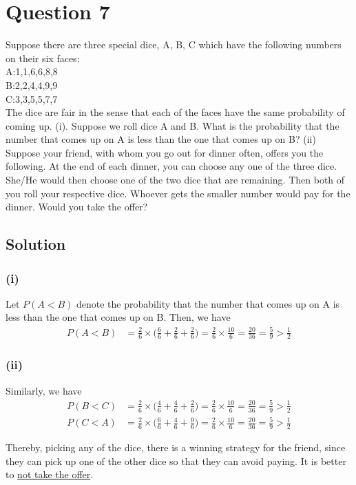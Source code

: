 \section*{Question 7}

Suppose there are three special dice, A, B, C which have the following numbers on their six faces: \\
A:\@ 1,1,6,6,8,8\\
B:\@ 2,2,4,4,9,9\\
C:\@ 3,3,5,5,7,7\\
The dice are fair in the sense that each of the faces have the same probability of coming up.
(i). Suppose we roll dice A and B.
What is the probability that the number that comes up on A is less than the one that comes up on B?
(ii) Suppose your friend, with whom you go out for dinner often, offers you the following.
At the end of each dinner, you can choose any one of the three dice.
She/He would then choose one of the two dice that are remaining.
Then both of you roll your respective dice.
Whoever gets the smaller number would pay for the dinner.
Would you take the offer?

\subsection*{Solution}

\subsubsection*{(i)}

Let \( P(A < B) \) denote the probability that the number that comes up on A is less than the one that comes up on B.
Then, we have
\begin{align*}
    P (A < B)
     & =
    \frac{2}{6} \times \Big( \frac{6}{6} + \frac{2}{6} + \frac{2}{6} \Big)
    =
    \frac{2}{6} \times \frac{10}{6}
    =
    \frac{20}{36}
    =
    \boxed{ \frac{5}{9} }
    >
    \frac{1}{2}
\end{align*}

\subsubsection*{(ii)}

Similarly, we have
\begin{align*}
    P (B < C)
     & =
    \frac{2}{6} \times \Big( \frac{4}{6} + \frac{4}{6} + \frac{2}{6} \Big)
    =
    \frac{2}{6} \times \frac{10}{6}
    =
    \frac{20}{36}
    =
    \frac{5}{9}
    >
    \frac{1}{2}
    \\
    P (C < A)
     & =
    \frac{2}{6} \times \Big( \frac{6}{6} + \frac{4}{6} + \frac{0}{6} \Big)
    =
    \frac{2}{6} \times \frac{10}{6}
    =
    \frac{20}{36}
    =
    \frac{5}{9}
    >
    \frac{1}{2}
\end{align*}

Thereby, picking any of the dice, there is a winning strategy for the friend, since they can pick up one of the other dice so that they can avoid paying.
It is better to \underline{not take the offer}.

